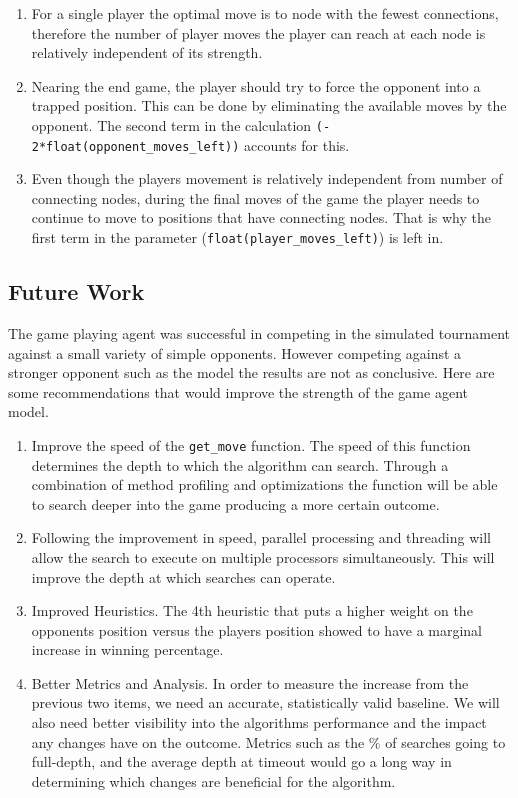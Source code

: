 \documentclass{article}
\begin{document}
\begin{enumerate}
\item For a single player the optimal move is to node with the fewest connections, therefore the number of player moves the player can reach at each node is relatively independent of its strength.

\item Nearing the end game, the player should try to force the opponent into a trapped position. This can be done by eliminating the available moves by the opponent. The second term in the calculation \verb|(- 2*float(opponent_moves_left))| accounts for this.

\item Even though the players movement is relatively independent from number of connecting nodes, during the final moves of the game the player needs to continue to move to positions that have connecting nodes. That is why the first term in the parameter (\verb|float(player_moves_left)|) is left in.
\end{enumerate}


\subsection{Future Work}

The game playing agent was successful in competing in the simulated tournament against
a small variety of simple opponents. However competing against a stronger opponent such as
the \texttt{} model the results are not as conclusive. Here are
some recommendations that would improve the strength of the game agent model.\newline
\begin{enumerate}
\item Improve the speed of the \verb|get_move| function. The speed of this function determines
the depth to which the algorithm can search. Through a combination of method profiling and optimizations
the function will be able to search deeper into the game producing a more certain outcome.

\item Following the improvement in speed, parallel processing and threading will allow the search to
execute on multiple processors simultaneously. This will improve the depth at which searches can operate.

\item Improved Heuristics. The 4th heuristic that puts a higher weight on the opponents position versus the
players position showed to have a marginal increase in winning percentage.

\item Better Metrics and Analysis. In order to measure the increase from the previous two items, we need an
accurate, statistically valid baseline. We will also need better visibility into the algorithms performance
and the impact any changes have on the outcome. Metrics such as the \% of searches going to full-depth, and the
average depth at timeout would go a long way in determining which changes are beneficial for the algorithm.
\end{enumerate}
\end{document}
